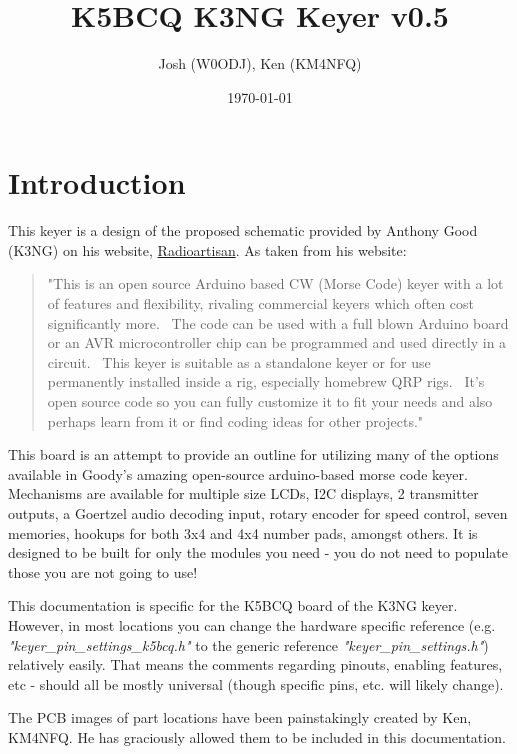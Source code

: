 \documentclass[11pt]{article}
\author{Josh (W0ODJ), Ken (KM4NFQ)}
\date{\today}
\title{K5BCQ K3NG Keyer v0.5}
\begin{document}
\maketitle
\tableofcontents


\section{Introduction}
\label{sec:orgcad35dc}
This keyer is a design of the proposed schematic provided by Anthony Good (K3NG) on his website, \href{https://blog.radioartisan.com/arduino-cw-keyer}{Radioartisan}.  As taken from his website:
\begin{quote}
"This is an open source Arduino based CW (Morse Code) keyer with a lot of features and flexibility, rivaling commercial keyers which often cost significantly more.  The code can be used with a full blown Arduino board or an AVR microcontroller chip can be programmed and used directly in a circuit.  This keyer is suitable as a standalone keyer or for use permanently installed inside a rig, especially homebrew QRP rigs.  It’s open source code so you can fully customize it to fit your needs and also perhaps learn from it or find coding ideas for other projects."
\end{quote}


This board is an attempt to provide an outline for utilizing many of the options available in Goody's amazing open-source arduino-based morse code keyer.  Mechanisms are available for multiple size LCDs, I2C displays, 2 transmitter outputs, a Goertzel audio decoding input, rotary encoder for speed control, seven memories, hookups for both 3x4 and 4x4 number pads, amongst others.  It is designed to be built for only the modules you need - you do not need to populate those you are not going to use!

This documentation is specific for the K5BCQ board of the K3NG keyer.  However, in most locations you can change the hardware specific reference (e.g. \emph{"keyer\_pin\_settings\_k5bcq.h"} to the generic reference \emph{"keyer\_pin\_settings.h"}) relatively easily.  That means the comments regarding pinouts, enabling features, etc - should all be mostly universal (though specific pins, etc. will likely change).

The PCB images of part locations have been painstakingly created by Ken, KM4NFQ.  He has graciously allowed them to be included in this documentation.
\end{document}

